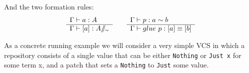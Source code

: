 And the two formation rules:
\begin{equation}
  \begin{centering}
  \label{eq:coequalizer-formation}
  \begin{array}[t]{l}
    \Gamma \vdash a : A\\
    \hline
    \Gamma \vdash [a] : A \quot{\sim}\\
  \end{array}
  \qquad
  \begin{array}[t]{l}
    \Gamma \vdash p : a \sim b\\
    \hline
    \Gamma \vdash glue~p : [a] \equiv [b]
  \end{array}
  \end{centering}
\end{equation}

As a concrete running example we will consider a very simple VCS in which a
repository consists of a single value that can be either \texttt{Nothing} or
\texttt{Just x} for some term x, and a patch that sets a \texttt{Nothing} to
\texttt{Just} some value.

